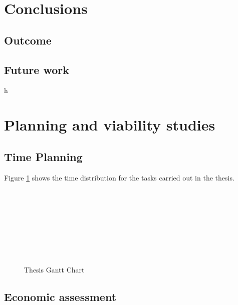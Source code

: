 \documentclass[a4paper,11pt, titlepage, twoside]{article}
\begin{document}
\section{Conclusions}\label{Conclusions}
\subsection{Outcome}
\subsection{Future work}
h
\section{Planning and viability studies}\label{Planning}

\subsection{Time Planning}

Figure \ref{fig:gantt} shows the time distribution for the tasks carried out in the thesis.
\begin{figure}[h]
\begin{center}
\begin{ganttchart}{1}{20}
     \\
         \\
     \\
     \\
     \\
     \\
     \\
\end{ganttchart}
\caption{Thesis Gantt Chart}
\label{fig:gantt}
\end{center}
\end{figure}

\subsection{Economic assessment}
\end{document}
